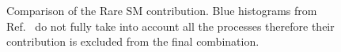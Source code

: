 \begin{figure}[htp]
\begin{center}
 \\
 \\
\caption{Comparison of the Rare SM contribution.  Blue histograms from Ref.~\cite{AN2012:256} do not fully take into account 
all the processes therefore their contribution is excluded from the final combination.}
\label{fig:rare1}
\end{center}
\end{figure}

